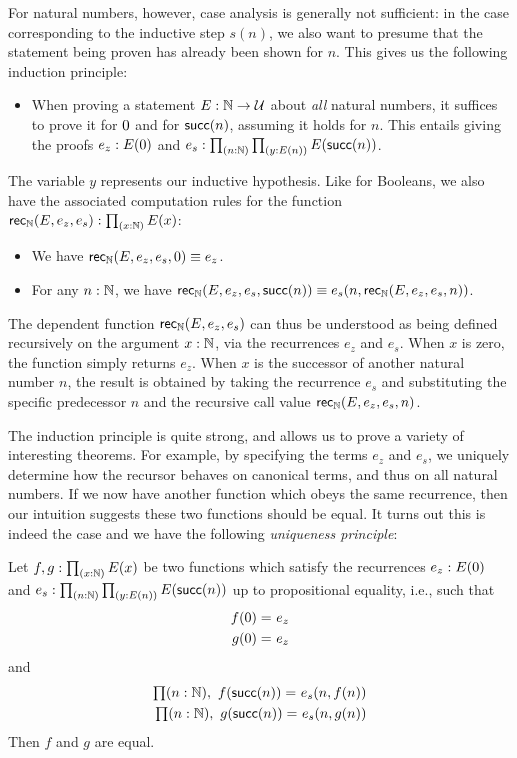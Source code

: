 For natural numbers, however, case analysis is generally not sufficient: in the case corresponding to the inductive step $s(n)$, we also want to presume that the statement being proven has already been shown for $n$.
This gives us the following induction principle:
\begin{itemize}
\item When proving a statement $E : \mathbb{N} \to \mathcal{U}$ about \emph{all} natural numbers, it suffices to prove it for $0$ and for $\mathsf{succ}(n)$, assuming it holds
for $n$. This entails giving the proofs $e_z : E(0)$ and $e_s : \prd{n : \nat}{y : E(n)} E(\s(n))$.
\end{itemize}
The variable $y$ represents our inductive hypothesis. Like for Booleans, we also have the associated computation rules for the function $\rec\nat(E,e_z,e_s) : \prd{x:\nat} E(x)$:
\begin{itemize}
\item We have $\mathsf{rec}_{\mathbb{N}}(E,e_z,e_s,0) \equiv e_z$.
\item For any $n : \mathbb{N}$, we have $\mathsf{rec}_{\mathbb{N}}(E,e_z,e_s,\mathsf{succ}(n)) \equiv e_s(n,\mathsf{rec}_{\mathbb{N}}(E,e_z,e_s,n))$.
\end{itemize}
The dependent function $\mathsf{rec}_{\mathbb{N}}(E,e_z,e_s)$ can thus be understood as being defined recursively on the argument $x : \mathbb{N}$, via the recurrences $e_z$ and $e_s$.
When $x$ is zero, the function simply returns $e_z$.
When $x$ is the successor of another natural number $n$, the result is obtained by taking the recurrence $e_s$ and substituting the specific predecessor $n$ and the recursive call value $\mathsf{rec}_{\mathbb{N}}(E,e_z,e_s,n)$.


The induction principle is quite strong, and allows us to prove a variety of interesting theorems. For example, by specifying the terms $e_z$ and $e_s$, we uniquely determine how the recursor behaves on canonical terms, and thus on all natural numbers. If we now have another function which obeys the same recurrence, then our intuition suggests these two functions should be equal. It turns out this is indeed the case and we have the following \emph{uniqueness principle}:

\begin{thm}\label{thm:nat-uniq}
Let $f,g : \prd{x:\nat} E(x)$ be two functions which satisfy the recurrences $e_z : E(0)$ and $e_s : \prd{n : \nat}{y : E(n)} E(\s(n))$ up to propositional equality, i.e., such that
\begin{align*}
f(0) =_{} e_z \\ 
g(0) =_{} e_z
\end{align*}
and 
\begin{align*}
\prd{n : \nat} \id{f(\s(n))}{e_s(n, f(n))} \\
\prd{n : \nat} \id{g(\s(n))}{e_s(n, g(n))}
\end{align*}
Then $f$ and $g$ are equal. 
\end{thm}

